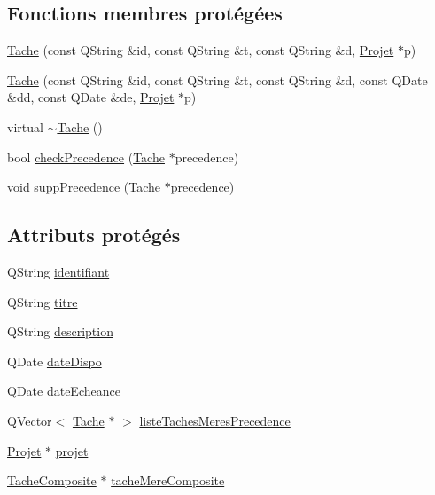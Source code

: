 \subsection*{Fonctions membres protégées}
\begin{DoxyCompactItemize}
\item 
\hyperlink{class_tache_af712b59bd6e56adc46904a6445431ae7}{Tache} (const Q\+String \&id, const Q\+String \&t, const Q\+String \&d, \hyperlink{class_projet}{Projet} $\ast$p)
\item 
\hyperlink{class_tache_a5b02c50c65270708b1a18c1a810ca00a}{Tache} (const Q\+String \&id, const Q\+String \&t, const Q\+String \&d, const Q\+Date \&dd, const Q\+Date \&de, \hyperlink{class_projet}{Projet} $\ast$p)
\item 
virtual \hyperlink{class_tache_a7ff832b739f8365acbe60275c7868c63}{$\sim$\+Tache} ()
\item 
bool \hyperlink{class_tache_a579d9a3b88293522b7326e5d11815091}{check\+Precedence} (\hyperlink{class_tache}{Tache} $\ast$precedence)
\item 
void \hyperlink{class_tache_a00babe6049701a1148eaca5336454731}{supp\+Precedence} (\hyperlink{class_tache}{Tache} $\ast$precedence)
\end{DoxyCompactItemize}
\subsection*{Attributs protégés}
\begin{DoxyCompactItemize}
\item 
Q\+String \hyperlink{class_tache_a9af1773c9b835900bba8814cccee450e}{identifiant}
\item 
Q\+String \hyperlink{class_tache_a1d3d20046c0c4cc8482f71bb555b79cf}{titre}
\item 
Q\+String \hyperlink{class_tache_ab3d06410b2c62ebfbe20f570c41dc4d4}{description}
\item 
Q\+Date \hyperlink{class_tache_ac8758b826b1be639dad8bcb556659a36}{date\+Dispo}
\item 
Q\+Date \hyperlink{class_tache_a7671c127da40ae35075f069a64396f45}{date\+Echeance}
\item 
Q\+Vector$<$ \hyperlink{class_tache}{Tache} $\ast$ $>$ \hyperlink{class_tache_a0f73920789e27b7c2aeb47d171d5e543}{liste\+Taches\+Meres\+Precedence}
\item 
\hyperlink{class_projet}{Projet} $\ast$ \hyperlink{class_tache_a0c6d513a2a376b18cb73ab726fe4dec1}{projet}
\item 
\hyperlink{class_tache_composite}{Tache\+Composite} $\ast$ \hyperlink{class_tache_a62e6fe2722630c7bdf9a4a6a42364a19}{tache\+Mere\+Composite}
\end{DoxyCompactItemize}
